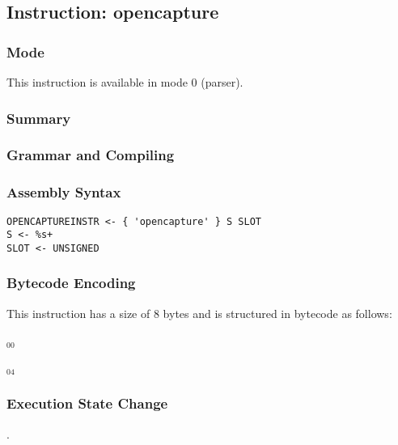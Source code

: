\subsection{Instruction: opencapture}

\subsubsection{Mode}
This instruction is available in mode 0 (parser).
\subsubsection{Summary}


\subsubsection{Grammar and Compiling}


\subsubsection{Assembly Syntax}

\begin{myquote}
\begin{verbatim}
OPENCAPTUREINSTR <- { 'opencapture' } S SLOT
S <- %s+
SLOT <- UNSIGNED
\end{verbatim}
\end{myquote}

\subsubsection{Bytecode Encoding}

This instruction has a size of 8 bytes and is structured in bytecode as follows:

$_{00}$\ 



$_{04}$\ 


\subsubsection{Execution State Change}

.


